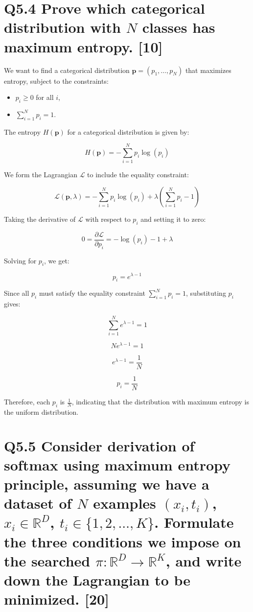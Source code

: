 \documentclass[11pt]{article}
\begin{document}
\section{Q5.4 Prove which categorical distribution with $N$ classes has maximum entropy. [10]}

We want to find a categorical distribution \( \mathbf{p} = (p_1, \ldots, p_N) \) that maximizes entropy, subject to the constraints:

\begin{itemize}
    \item \( p_i \geq 0 \) for all \( i \),
    \item \( \sum_{i=1}^{N} p_i = 1 \).
\end{itemize}

The entropy \( H(\mathbf{p}) \) for a categorical distribution is given by:

\[ H(\mathbf{p}) = -\sum_{i=1}^{N} p_i \log(p_i) \]

We form the Lagrangian \( \mathcal{L} \) to include the equality constraint:

\[ \mathcal{L}(\mathbf{p}, \lambda) = -\sum_{i=1}^{N} p_i \log(p_i) + \lambda \left( \sum_{i=1}^{N} p_i - 1 \right) \]

Taking the derivative of \( \mathcal{L} \) with respect to \( p_i \) and setting it to zero:

\[ 0 = \frac{\partial \mathcal{L}}{\partial p_i} = -\log(p_i) - 1 + \lambda \]

Solving for \( p_i \), we get:

\[ p_i = e^{\lambda - 1} \]

Since all \( p_i \) must satisfy the equality constraint \( \sum_{i=1}^{N} p_i = 1 \), substituting \( p_i \) gives:

\[ \sum_{i=1}^{N} e^{\lambda - 1} = 1 \]

\[ N e^{\lambda - 1} = 1 \]

\[ e^{\lambda - 1} = \frac{1}{N} \]

\[ p_i = \frac{1}{N} \]

Therefore, each \( p_i \) is \( \frac{1}{N} \), indicating that the distribution with maximum entropy is the uniform distribution.

\section{Q5.5 Consider derivation of softmax using maximum entropy principle, assuming we have a dataset of $N$ examples $(x_i,t_i)$, $x_i \in \mathbb{R}^D$, $t_i \in \{1,2,\ldots,K\}$. Formulate the three conditions we impose on the searched $\pi:\mathbb{R}^D \rightarrow \mathbb{R}^K$, and write down the Lagrangian to be minimized. [20]}
\end{document}
